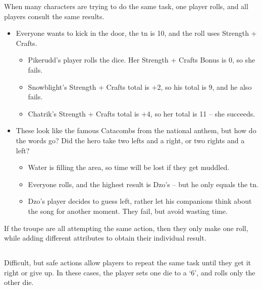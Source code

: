 \begin{multicols}{2}
When many characters are trying to do the same task, one player rolls, and all players consult the same results.

\begin{exampletext}
\begin{itemize}
  \item
  Everyone wants to kick in the door, the \gls{tn} is 10, and the roll uses Strength + Crafts.
    \begin{itemize}
    \item
    Pikerudd's player rolls the dice. Her Strength + Crafts Bonus is 0, so she fails.
    \item
    Snowblight's Strength + Crafts total is +2, so his total is 9, and he also fails.
    \item
    Chatrik's Strength + Crafts total is +4, so her total is 11 -- she succeeds.
    \end{itemize}
  \item
  These look like the famous Catacombs from the national anthem, but how do the words go?
  Did the hero take two lefts and a right, or two rights and a left?
    \begin{itemize}
    \item
    Water is filling the area, so time will be lost if they get muddled.
    \item
    Everyone rolls, and the highest result is Dzo's -- but he only equals the \gls{tn}.
    \item
    Dzo's player decides to guess left, rather let his companions think about the song for another moment.
    They fail, but avoid wasting time.
    \end{itemize}
\end{itemize}

\end{exampletext}

If the troupe are all attempting the same action, then they only make one roll, while adding different attributes to obtain their individual result.

\subsection{}
\label{restingactions}

Difficult, but safe actions allow players to repeat the same task until they get it right or give up.
In these cases, the player sets one die to a `6', and rolls only the other die.


\end{multicols}
